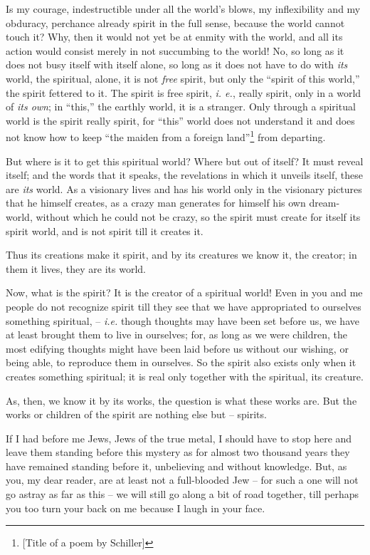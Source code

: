 \documentclass[12pt,a4paper]{book}
\begin{document}
Is my courage, indestructible under all the world's blows, my inflexibility 
and my obduracy, perchance already spirit in the full sense, because the world 
cannot touch it? Why, then it would not yet be at enmity with the world, and 
all its action would consist merely in not succumbing to the world! No, so 
long as it does not busy itself with itself alone, so long as it does not have 
to do with \textit{its} world, the spiritual, alone, it is not \textit{free} 
spirit, but only the ``spirit of this world,'' the spirit fettered to it. 
The spirit is free spirit, \textit{i. e.}, really spirit, only in a world of 
\textit{its own}; in ``this,'' the earthly world, it is a stranger. Only 
through a spiritual world is the spirit really spirit, for ``this'' world 
does not understand it and does not know how to keep ``the maiden from a 
foreign land''\footnote{[Title of a poem by Schiller]} from departing.

But where is it to get this spiritual world? Where but out of itself? It must 
reveal itself; and the words that it speaks, the revelations in which it 
unveils itself, these are \textit{its} world. As a visionary lives and has his 
world only in the visionary pictures that he himself creates, as a crazy man 
generates for himself his own dream-world, without which he could not be 
crazy, so the spirit must create for itself its spirit world, and is not 
spirit till it creates it.

Thus its creations make it spirit, and by its creatures we know it, the 
creator; in them it lives, they are its world.

Now, what is the spirit? It is the creator of a spiritual world! Even in you 
and me people do not recognize spirit till they see that we have appropriated 
to ourselves something spiritual, -- \textit{i.e.} though thoughts may have 
been set before us, we have at least brought them to live in ourselves; for, 
as long as we were children, the most edifying thoughts might have been laid 
before us without our wishing, or being able, to reproduce them in ourselves. 
So the spirit also exists only when it creates something spiritual; it is real 
only together with the spiritual, its creature.

As, then, we know it by its works, the question is what these works are. But 
the works or children of the spirit are nothing else but -- spirits.

If I had before me Jews, Jews of the true metal, I should have to stop here 
and leave them standing before this mystery as for almost two thousand years 
they have remained standing before it, unbelieving and without knowledge. But, 
as you, my dear reader, are at least not a full-blooded Jew -- for such a one 
will not go astray as far as this -- we will still go along a bit of road 
together, till perhaps you too turn your back on me because I laugh in your 
face.
\end{document}
